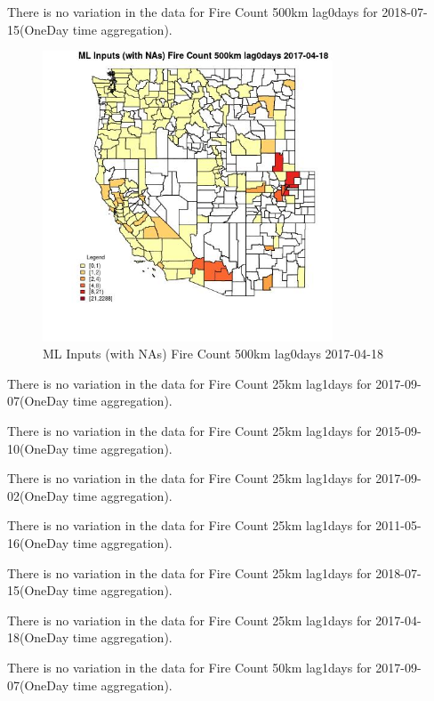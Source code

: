 There is no variation in the data for Fire Count 500km lag0days for 2018-07-15(OneDay time aggregation). 
 

\begin{figure} 
\centering  
\includegraphics[width=0.77\textwidth]{Code_Outputs/Report_ML_input_PM25_Step4_part_e_de_duplicated_aves_compiled_2019-05-21wNAs_CountyFire_Count_500km_lag0daysMean2017-04-18.jpg} 
\caption{\label{fig:Report_ML_input_PM25_Step4_part_e_de_duplicated_aves_compiled_2019-05-21wNAsCountyFire_Count_500km_lag0daysMean2017-04-18}ML Inputs (with NAs) Fire Count 500km lag0days 2017-04-18} 
\end{figure} 
 

There is no variation in the data for Fire Count 25km lag1days for 2017-09-07(OneDay time aggregation). 
 

There is no variation in the data for Fire Count 25km lag1days for 2015-09-10(OneDay time aggregation). 
 

There is no variation in the data for Fire Count 25km lag1days for 2017-09-02(OneDay time aggregation). 
 

There is no variation in the data for Fire Count 25km lag1days for 2011-05-16(OneDay time aggregation). 
 

There is no variation in the data for Fire Count 25km lag1days for 2018-07-15(OneDay time aggregation). 
 

There is no variation in the data for Fire Count 25km lag1days for 2017-04-18(OneDay time aggregation). 
 

There is no variation in the data for Fire Count 50km lag1days for 2017-09-07(OneDay time aggregation). 
 

